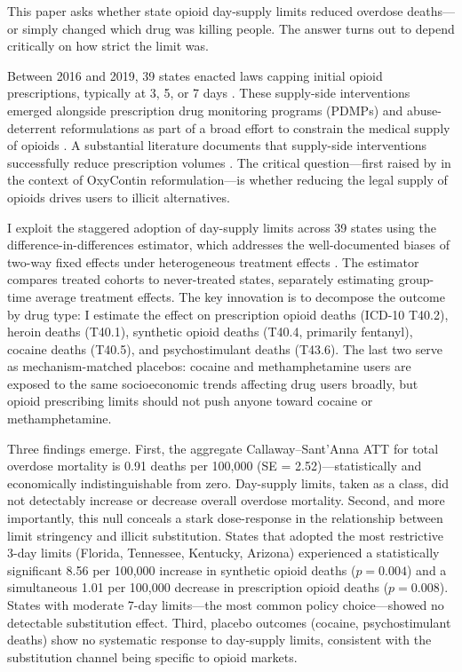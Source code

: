 \documentclass[12pt]{article}
\begin{document}
This paper asks whether state opioid day-supply limits reduced overdose deaths---or simply changed which drug was killing people. The answer turns out to depend critically on how strict the limit was.

Between 2016 and 2019, 39 states enacted laws capping initial opioid prescriptions, typically at 3, 5, or 7 days \citep{davis2019laws}. These supply-side interventions emerged alongside prescription drug monitoring programs (PDMPs) and abuse-deterrent reformulations as part of a broad effort to constrain the medical supply of opioids \citep{dowell2016cdc}. A substantial literature documents that supply-side interventions successfully reduce prescription volumes \citep{buchmueller2020effect, meara2016state, grecu2019mandatory}. The critical question---first raised by \citet{alpert2018supply} in the context of OxyContin reformulation---is whether reducing the legal supply of opioids drives users to illicit alternatives.

I exploit the staggered adoption of day-supply limits across 39 states using the \citet{callaway2021difference} difference-in-differences estimator, which addresses the well-documented biases of two-way fixed effects under heterogeneous treatment effects \citep{goodmanbacon2021difference, dechaisemartin2020two, sun2021estimating}. The estimator compares treated cohorts to never-treated states, separately estimating group-time average treatment effects. The key innovation is to decompose the outcome by drug type: I estimate the effect on prescription opioid deaths (ICD-10 T40.2), heroin deaths (T40.1), synthetic opioid deaths (T40.4, primarily fentanyl), cocaine deaths (T40.5), and psychostimulant deaths (T43.6). The last two serve as mechanism-matched placebos: cocaine and methamphetamine users are exposed to the same socioeconomic trends affecting drug users broadly, but opioid prescribing limits should not push anyone toward cocaine or methamphetamine.

Three findings emerge. First, the aggregate Callaway--Sant'Anna ATT for total overdose mortality is 0.91 deaths per 100,000 (SE = 2.52)---statistically and economically indistinguishable from zero. Day-supply limits, taken as a class, did not detectably increase or decrease overall overdose mortality. Second, and more importantly, this null conceals a stark dose-response in the relationship between limit stringency and illicit substitution. States that adopted the most restrictive 3-day limits (Florida, Tennessee, Kentucky, Arizona) experienced a statistically significant 8.56 per 100,000 increase in synthetic opioid deaths ($p = 0.004$) and a simultaneous 1.01 per 100,000 decrease in prescription opioid deaths ($p = 0.008$). States with moderate 7-day limits---the most common policy choice---showed no detectable substitution effect. Third, placebo outcomes (cocaine, psychostimulant deaths) show no systematic response to day-supply limits, consistent with the substitution channel being specific to opioid markets.
\end{document}
